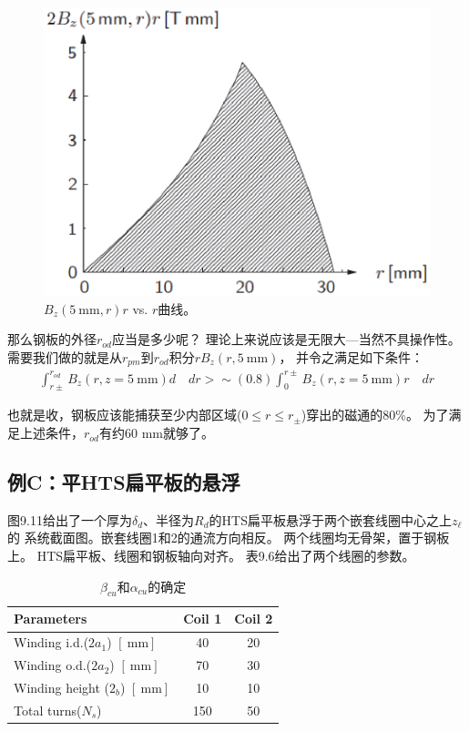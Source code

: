 \begin{figure}
	\centering
	\includegraphics[scale=0.6]{chpt9/figs/fig9.10.eps}
	\caption{$B_z(5\ \mathrm{mm},r)r$ vs. $r$曲线。}
\end{figure}

那么钢板的外径$r_{od}$应当是多少呢？
理论上来说应该是无限大---当然不具操作性。
需要我们做的就是从$r_{pm}$到$r_{od}$积分$rB_z(r,5\ \mathrm{mm})$，
并令之满足如下条件：
\begin{align*}%
\int_{r\pm}^{r_{od}}B_{z}(r,z=5\ \mathrm{ mm})d\quad dr>\sim(0.8)\int_{0}^{r\pm}B_{z}(r,z=5\ \mathrm{ mm})r\quad dr
\end{align*}

也就是收，钢板应该能捕获至少内部区域($0\le r\le r_{\pm}$)穿出的磁通的80\%。
为了满足上述条件，$r_{od}$有约60 mm就够了。


\subsection{例C：平HTS扁平板的悬浮}
图9.11给出了一个厚为$\delta_d$、半径为$R_d$的HTS扁平板悬浮于两个嵌套线圈中心之上$z_\ell$的
系统截面图。嵌套线圈1和2的通流方向相反。
两个线圈均无骨架，置于钢板上。
HTS扁平板、线圈和钢板轴向对齐。
表9.6给出了两个线圈的参数。


\begin{table}[htbp]\small
\centering
\caption{$\beta_{cu}$和$\alpha_{cu}$的确定}  
\begin{tabular}{|l|c|c|}
\hline
Parameters & Coil 1 & Coil 2 \\ \hline
Winding i.d.($2a_1$) $\left[\ \mathrm{mm}\right]$ & 40 & 20 \\ \hline
Winding o.d.($2a_2$) $\left[\ \mathrm{mm}\right]$ & 70 & 30 \\ \hline
Winding height ($2_b$) $\left[\ \mathrm{mm}\right]$ & 10 & 10 \\ \hline
Total turns($N_s$) & 150 & 50 \\ \hline
\end{tabular}
\end{table}


